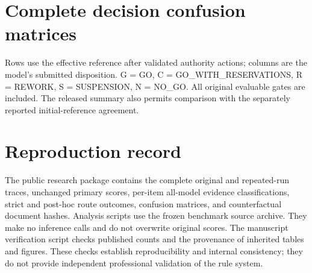 \section{Complete decision confusion matrices}

Rows use the effective reference after validated authority actions; columns are the model's
submitted disposition. G = GO, C = GO\_WITH\_RESERVATIONS, R = REWORK, S = SUSPENSION,
N = NO\_GO. All original evaluable gates are included. The released summary also permits comparison
with the separately reported initial-reference agreement.



\section{Reproduction record}

The public research package contains the complete original and repeated-run traces, unchanged
primary scores, per-item all-model evidence classifications, strict and post-hoc route outcomes,
confusion matrices, and counterfactual document hashes. Analysis scripts use the frozen benchmark
source archive. They make no inference calls and do not overwrite original scores. The manuscript
verification script checks published counts and the provenance of inherited tables and figures.
These checks establish reproducibility and internal consistency; they do not provide independent
professional validation of the rule system.
